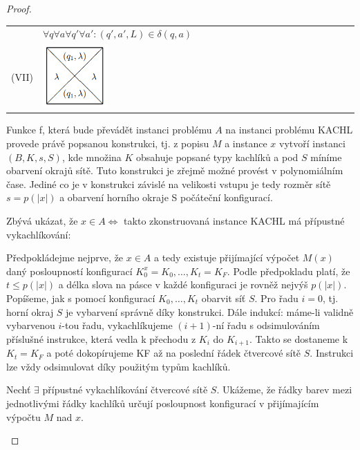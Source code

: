 \documentclass[11pt]{report} %
\begin{document}
\begin{proof}
\begin{table}[H]
\begin{tabular}{| m{0.05\linewidth}  m{0.45\linewidth} | m{0.5\linewidth}| }
		& $\forall q \forall a \forall q' \forall a' : (q',a',L) \in \delta(q,a)$\\
		(VII) & \includegraphics[width=70pt]{img/kachl7.png} 
		& \\ \hline

	\end{tabular}

\end{table}

Funkce f, která bude převádět instanci problému $A$ na instanci problému KACHL provede právě popsanou konstrukci, tj. z popisu $M$ a instance $x$ vytvoří instanci $(B, K, s, S)$, kde množina $K$ obsahuje popsané typy kachlíků a pod $S$ míníme obarvení okrajů sítě. Tuto konstrukci je zřejmě možné provést v polynomiálním čase. Jediné co je v konstrukci závislé na velikosti vstupu je tedy rozměr sítě $s = p(|x|)$ a obarvení horního okraje S počáteční konfigurací.

Zbývá ukázat, že $x \in A \Leftrightarrow $ takto zkonstruovaná instance KACHL má přípustné vykachlíkování:
\begin{description}
	\leftskip 40pt
	\item[$\Rightarrow$:] 
	Předpokládejme nejprve, že $x \in A$ a tedy existuje přijímající výpočet $M(x)$ daný posloupností konfigurací $K_0^x = K_0, \dots, K_t = K_F$. Podle předpokladu platí, že $t \leq p(|x|)$ a délka slova na pásce v každé konfiguraci je rovněž nejvýš $p(|x|)$. Popíšeme, jak s pomocí konfigurací $K_0, \dots, K_t$ obarvit síť $S$. Pro řadu $i = 0$, tj. horní okraj $S$ je vybarvení správně díky konstrukci. Dále indukcí: máme-li validně vybarvenou $i$-tou řadu, vykachlíkujeme $(i + 1)$-ní řadu s odsimulováním příslušné instrukce, která vedla k přechodu z $K_i$ do $K_{i+1}$. Takto se dostaneme k $K_t = K_F$ a poté dokopírujeme KF až na poslední řádek čtvercové sítě $S$. 
	Instrukci lze vždy odsimulovat díky použitým typům kachlíků. 

	\item[$\Leftarrow$] Nechť $\exists$ přípustné vykachlíkování čtvercové sítě $S$. Ukážeme, že řádky barev mezi jednotlivými řádky kachlíků určují posloupnost konfigurací v přijímajícím výpočtu $M$ nad $x$. 
	

\end{description}
\end{proof}
\end{document}
